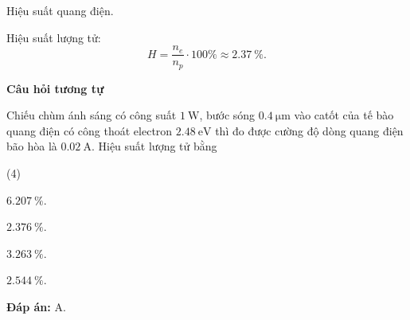 \begin{dang}{Hiệu suất quang điện.}
{		Hiệu suất lượng tử:
		\begin{equation*}
			H=\dfrac{n_e}{n_p} \cdot 100 \% \approx \SI{2.37}{\percent}.
		\end{equation*}
		
		\begin{center}
			\textbf{Câu hỏi tương tự}
		\end{center}
		
		Chiếu chùm ánh sáng có công suất $\SI{1}{\watt}$, bước sóng $\SI{0.4}{\micro \meter}$ vào catốt của tế bào quang điện có công thoát electron $\SI{2.48}{\electronvolt}$ thì đo được cường độ dòng quang điện bão hòa là $\SI{0.02}{\ampere}$. Hiệu suất lượng tử bằng
		\begin{mcq}(4)
			\item $\SI{6.207}{\percent}$.
			\item $\SI{2.376}{\percent}$.
			\item $\SI{3.263}{\percent}$.
			\item $\SI{2.544}{\percent}$.	
		\end{mcq}
		
		\textbf{Đáp án:} A.
	}
	
\end{dang}

